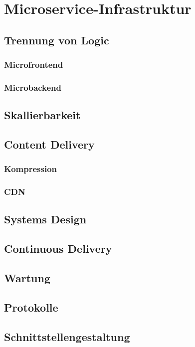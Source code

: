 \chapter{Microservice-Infrastruktur}

\section{Trennung von Logic}

\subsection{Microfrontend}

\subsection{Microbackend}

\section{Skallierbarkeit}

\section{Content Delivery}

\subsection{Kompression}
\subsection{CDN}

\section{Systems Design}

\section{Continuous Delivery}

\section{Wartung}

\section{Protokolle}

\section{Schnittstellengestaltung}
